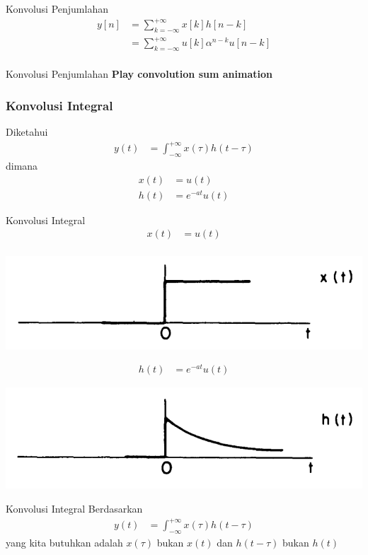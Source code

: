 \documentclass[pdflatex,compress,mathserif]{beamer}
\begin{document}
\begin{frame}{Konvolusi Penjumlahan}
	\begin{align*}
		y[n] &= \sum\limits_{k = -\infty}^{+\infty}x[k] h[n-k] \\
			 &= \sum\limits_{k = -\infty}^{+\infty}u[k] \alpha^{n-k}u[n-k] \\
	\end{align*}
\end{frame}


\begin{frame}{Konvolusi Penjumlahan}
	\textbf{Play convolution sum animation}
\end{frame}

\begin{frame}
	\frametitle{Konvolusi Integral}
	Diketahui
	\begin{align*}
		y(t) &= \int_{-\infty}^{+\infty} x(\tau) h(t-\tau)
	\end{align*}
	dimana
	\begin{align*}
		x(t) &= u(t) \\
		h(t) &= e^{-at} u(t)
	\end{align*}
\end{frame}

\begin{frame}{Konvolusi Integral}
	\begin{align*}
		x(t) &= u(t) \\
	\end{align*}
	\begin{center}
		\includegraphics[width=0.5\linewidth]{img/img12}
	\end{center}
	\begin{align*}
		h(t) &= e^{-at} u(t)
	\end{align*}
	\begin{center}
		\includegraphics[width=0.5\linewidth]{img/img13}
	\end{center}
\end{frame}

\begin{frame}{Konvolusi Integral}
	Berdasarkan
	\begin{align*}
		y(t) &= \int_{-\infty}^{+\infty} x(\tau) h(t-\tau)
	\end{align*}
	yang kita butuhkan adalah $ x(\tau) $ bukan $ x(t) $ dan $ h(t-\tau) $ bukan $ h(t) $
\end{frame}
\end{document}
